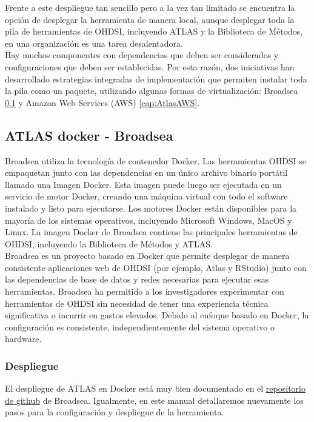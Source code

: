 \documentclass{article}
\begin{document}
Frente a este despliegue tan sencillo pero a la vez tan limitado se encuentra la opción de desplegar la herramienta de manera local, aunque desplegar toda la pila de herramientas de OHDSI, incluyendo ATLAS y la Biblioteca de Métodos, en una organización es una tarea desalentadora. \\

Hay muchos componentes con dependencias que deben ser considerados y configuraciones que deben ser establecidas. Por esta razón, dos iniciativas han desarrollado estrategias integradas de implementación que permiten instalar toda la pila como un paquete, utilizando algunas formas de virtualización: Broadsea \ref{cap:AtlasBroadsea} y Amazon Web Services (AWS) \ref{cap:AtlasAWS}. \cite{TheBookOfOhdsi}

\newpage
\subsection{ATLAS docker - Broadsea}\label{cap:AtlasBroadsea}

Broadsea utiliza la tecnología de contenedor Docker. Las herramientas OHDSI se empaquetan junto con las dependencias en un único archivo binario portátil llamado una Imagen Docker. Esta imagen puede luego ser ejecutada en un servicio de motor Docker, creando una máquina virtual con todo el software instalado y listo para ejecutarse. Los motores Docker están disponibles para la mayoría de los sistemas operativos, incluyendo Microsoft Windows, MacOS y Linux.  La imagen Docker de Broadsea contiene las principales herramientas de OHDSI, incluyendo la Biblioteca de Métodos y ATLAS. \cite{TheBookOfOhdsi} \\

Broadsea es un proyecto basado en Docker que permite desplegar de manera consistente aplicaciones web de OHDSI (por ejemplo, Atlas y RStudio) junto con las dependencias de base de datos y redes necesarias para ejecutar esas herramientas. Broadsea ha permitido a los investigadores experimentar con herramientas de OHDSI sin necesidad de tener una experiencia técnica significativa o incurrir en gastos elevados. Debido al enfoque basado en Docker, la configuración es consistente, independientemente del sistema operativo o hardware.  \cite{Broadsea3.0}

\subsubsection{Despliegue}

El despliegue de ATLAS en Docker está muy bien documentado en el  \href{https://github.com/OHDSI/Broadsea}{repositorio de github} de Broadsea. Igualmente, en este manual detallaremos nuevamente los pasos para la configuración y despliegue de la herramienta.\\
\end{document}
